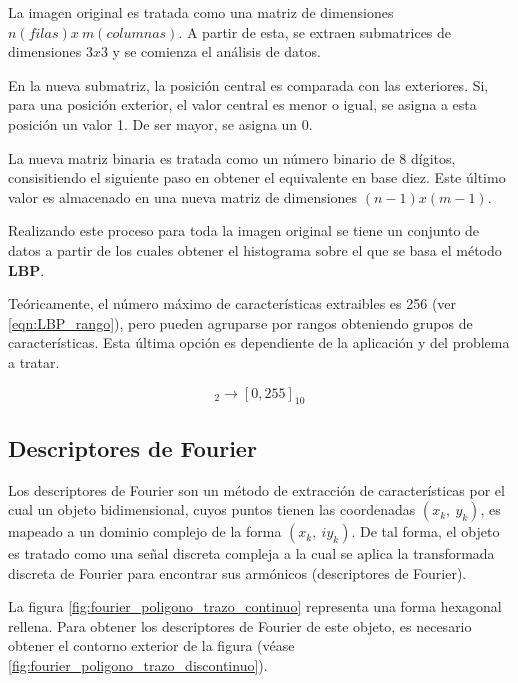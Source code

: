 La imagen original es tratada como una matriz de dimensiones $ n(filas) x\: m(columnas) $. A partir de esta, se extraen submatrices de dimensiones $3x3$ y se comienza el análisis de datos.

En la nueva submatriz, la posición central es comparada con las exteriores. Si, para una posición exterior, el valor central es menor o igual, se asigna a esta posición un valor 1. De ser mayor, se asigna un 0.

La nueva matriz binaria es tratada como un número binario de 8 dígitos, consisitiendo el siguiente paso en obtener el equivalente en base diez. Este último valor es almacenado en una nueva matriz de dimensiones $(n-1)x(m-1)$.

Realizando este proceso para toda la imagen original se tiene un conjunto de datos a partir de los cuales obtener el histograma sobre el que se basa el método \textbf{LBP}.

Teóricamente, el número máximo de características extraibles es 256 (ver \ref{eqn:LBP_rango}), pero pueden agruparse por rangos obteniendo grupos de características. Esta última opción es dependiente de la aplicación y del problema a tratar.

\begin{equation}
	[00000000, 11111111]_{2} \rightarrow [0, 255]_{10}
	\label{eqn:LBP_rango}
\end{equation}

\pagebreak
\subsection{Descriptores de Fourier} \label{subsection:fourier}

Los descriptores de Fourier son un método de extracción de características por el cual un objeto bidimensional, cuyos puntos tienen las coordenadas $ (x_{k},\:y_{k})$, es mapeado a un dominio complejo de la forma $(x_{k},\:iy_{k})$. De tal forma, el objeto es tratado como una señal discreta compleja a la cual se aplica la transformada discreta de Fourier para encontrar sus armónicos (descriptores de Fourier).

La figura \ref{fig:fourier_poligono_trazo_continuo} representa una forma hexagonal rellena. Para obtener los descriptores de Fourier de este objeto, es necesario obtener el contorno exterior de la figura (véase \ref{fig:fourier_poligono_trazo_discontinuo}).

